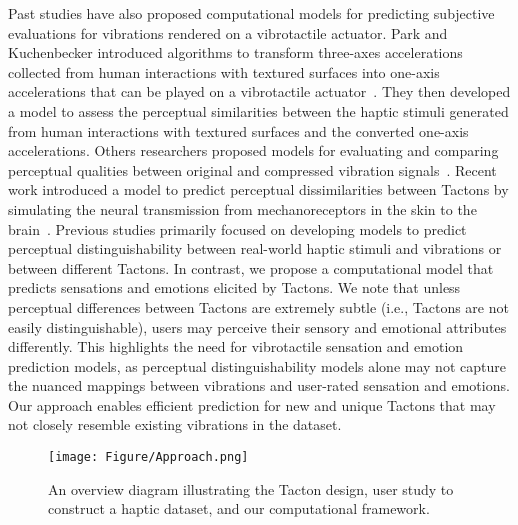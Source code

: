 Past studies have also proposed computational models for predicting subjective evaluations for vibrations rendered on a vibrotactile actuator.
Park and Kuchenbecker introduced algorithms to transform three-axes accelerations collected from human interactions with textured surfaces into one-axis accelerations that can be played on a vibrotactile actuator~\cite{park2019objective}.
They then developed a model to assess the perceptual similarities between the haptic stimuli generated from human interactions with textured surfaces and the converted one-axis accelerations.
Others researchers proposed models for evaluating and comparing perceptual qualities between original and compressed vibration signals~\cite{hassen2019subjective, muschter2021perceptual, noll2022automated}.
Recent work introduced a model to predict perceptual dissimilarities between Tactons by simulating the neural transmission from mechanoreceptors in the skin to the brain~\cite{lim2023can}.
Previous studies primarily focused on developing models to predict perceptual distinguishability between real-world haptic stimuli and vibrations or between different Tactons.
In contrast, we propose a computational model that predicts sensations and emotions elicited by Tactons.
We note that unless perceptual differences between Tactons are extremely subtle (i.e., Tactons are not easily distinguishable), users may perceive their sensory and emotional attributes differently. %
This highlights the need for vibrotactile sensation and emotion prediction models, as perceptual distinguishability models alone may not capture the nuanced mappings between vibrations and user-rated sensation and emotions.
Our approach enables efficient prediction for new and unique Tactons that may not closely resemble existing vibrations in the dataset.


\begin{figure*}[t]
  \centering
    \texttt{[image: Figure/Approach.png]}
    \caption{
    An overview diagram illustrating the Tacton design, user study to construct a haptic dataset, and our computational framework.
    }
  \label{fig:overview}
\end{figure*}